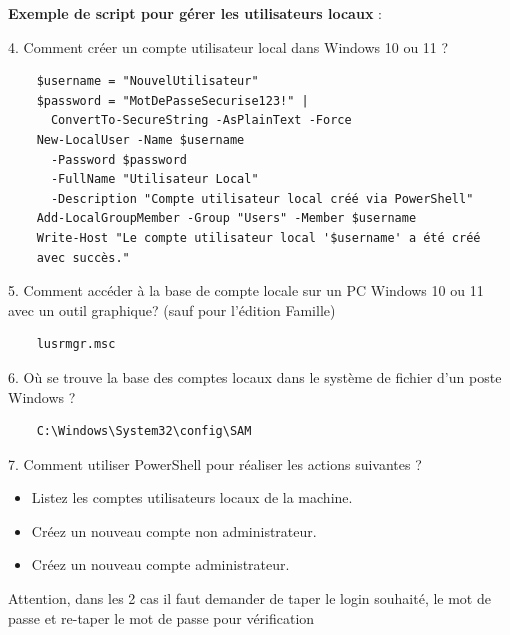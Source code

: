 \vspace{0.5cm}

\noindent \textbf{Exemple de script pour gérer les utilisateurs locaux} :

4. Comment créer un compte utilisateur local dans Windows 10 ou 11 ?

\begin{center}
  \begin{verbatim}
    $username = "NouvelUtilisateur"
    $password = "MotDePasseSecurise123!" |
      ConvertTo-SecureString -AsPlainText -Force
    New-LocalUser -Name $username 
      -Password $password 
      -FullName "Utilisateur Local" 
      -Description "Compte utilisateur local créé via PowerShell"
    Add-LocalGroupMember -Group "Users" -Member $username
    Write-Host "Le compte utilisateur local '$username' a été créé 
    avec succès."
  \end{verbatim}
\end{center}

5. Comment accéder à la base de compte locale sur un PC Windows 10 ou 11 avec un outil graphique? (sauf pour l'édition Famille)

\begin{center}
  \begin{verbatim}
    lusrmgr.msc
  \end{verbatim}
\end{center}

6. Où se trouve la base des comptes locaux dans le système de fichier d'un poste Windows ?

\begin{center}
  \begin{verbatim}
    C:\Windows\System32\config\SAM
  \end{verbatim}
\end{center}

\newpage

7. Comment utiliser PowerShell pour réaliser les actions suivantes ?
\begin{itemize}
  \item Listez les comptes utilisateurs locaux de la machine.
  \item Créez un nouveau compte non administrateur.
  \item Créez un nouveau compte administrateur.
\end{itemize}

\noindent Attention, dans les 2 cas il faut demander de taper le login souhaité, le mot de passe et re-taper le mot de passe pour vérification

